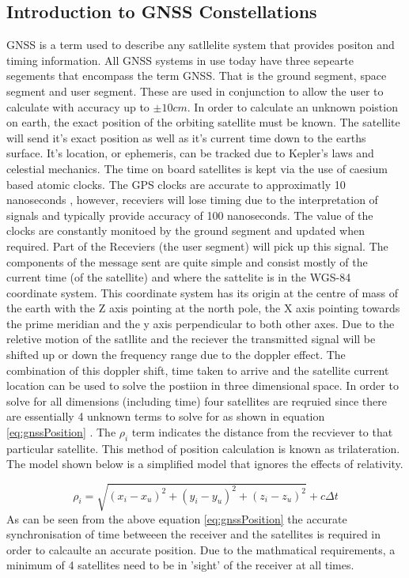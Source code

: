 \subsection{Introduction to GNSS Constellations}
GNSS is a term used to describe any satllelite system that provides positon and timing information. All GNSS systems in use today have three sepearte segements that
encompass the term GNSS. That is the ground segment, space segment and user segment. These are used in conjunction to allow the user to calculate with accuracy up to $\pm
10cm$. In order to calculate an unknown poistion on earth, the exact position of the orbiting satellite must be known. The satellite will send it's exact position as well
as it's current time down to the earths surface. It's location, or ephemeris, can be tracked due to Kepler's laws and celestial mechanics. The time on board satellites is
kept via the use of caesium based atomic clocks. The GPS clocks are accurate to approximatly 10 nanoseconds , however, receviers will lose timing due to
the interpretation of signals and typically provide accuracy of 100 nanoseconds. The value of the clocks are constantly monitoed by the ground segment and updated when
required. Part of the Receviers (the user segment) will pick up this signal. The components of the message sent are quite simple and consist
mostly of the current time (of the satellite) and where the sattelite is in the WGS-84 coordinate system\cite{RN46}. This coordinate system has its origin at the centre of mass of
the earth with the Z axis pointing at the north pole, the X axis pointing towards the prime meridian and the y axis perpendicular to both other axes. Due to the reletive
motion of the satllite and the reciever the transmitted signal will be shifted up or down the frequency range due to the doppler effect. The combination of this doppler
shift, time taken to arrive and the satellite current location can be used to solve the postiion in three dimensional space. In order to solve for all dimensions
(including time) four satellites are reqruied since there are essentially 4 unknown terms to solve for as shown in equation \ref{eq:gnssPosition} \cite{RN46}. The
$\rho_i$ term indicates the distance from the recviever to that particular satellite. This method of position calculation is known as trilateration. The model shown below
is a simplified model that ignores the effects of relativity. 

\begin{equation} \label{eq:gnssPosition} 
    \rho_i = \sqrt{(x_i - x_u)^2 + (y_i - y_u)^2 + (z_i - z_u)^2} + c \Delta t
\end{equation}
As can be seen from the above equation \ref{eq:gnssPosition} the accurate synchronisation of time betweeen the receiver and the satellites is required in order to
calcaulte an accurate position. Due to the mathmatical requirements, a minimum of 4 satellites need to be in 'sight' of the receiver at all times.

